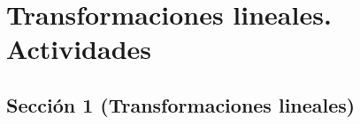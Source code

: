 \section{Transformaciones lineales. Actividades}
\subsection{Sección 1 (Transformaciones lineales)}





